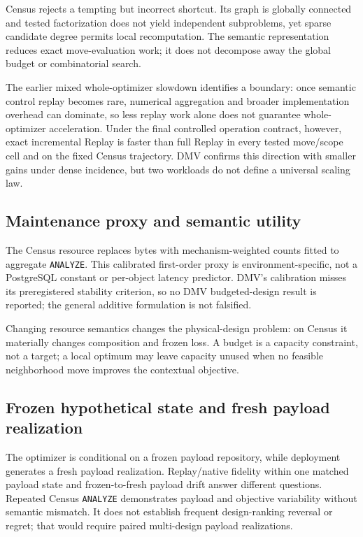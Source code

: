 \documentclass[sigconf,nonacm]{acmart}
\begin{document}
Census rejects a tempting but incorrect shortcut. Its graph is globally connected and tested factorization does not yield independent subproblems, yet sparse candidate degree permits local recomputation. The semantic representation reduces exact move-evaluation work; it does not decompose away the global budget or combinatorial search.

The earlier mixed whole-optimizer slowdown identifies a boundary: once semantic control replay becomes rare, numerical aggregation and broader implementation overhead can dominate, so less replay work alone does not guarantee whole-optimizer acceleration. Under the final controlled operation contract, however, exact incremental Replay is faster than full Replay in every tested move/scope cell and on the fixed Census trajectory. DMV confirms this direction with smaller gains under dense incidence, but two workloads do not define a universal scaling law.

\subsection{Maintenance proxy and semantic utility}

The Census resource replaces bytes with mechanism-weighted counts fitted to aggregate \texttt{ANALYZE}. This calibrated first-order proxy is environment-specific, not a PostgreSQL constant or per-object latency predictor. DMV's calibration misses its preregistered stability criterion, so no DMV budgeted-design result is reported; the general additive formulation is not falsified.

Changing resource semantics changes the physical-design problem: on Census it materially changes composition and frozen loss. A budget is a capacity constraint, not a target; a local optimum may leave capacity unused when no feasible neighborhood move improves the contextual objective.

\subsection{Frozen hypothetical state and fresh payload realization}

The optimizer is conditional on a frozen payload repository, while deployment generates a fresh payload realization. Replay/native fidelity within one matched payload state and frozen-to-fresh payload drift answer different questions. Repeated Census \texttt{ANALYZE} demonstrates payload and objective variability without semantic mismatch. It does not establish frequent design-ranking reversal or regret; that would require paired multi-design payload realizations.
\end{document}

